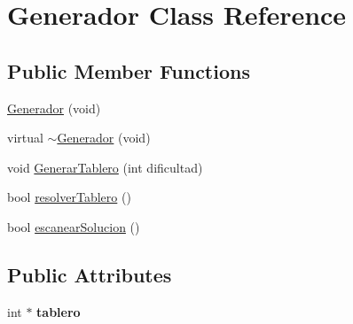 \hypertarget{class_generador}{\section{Generador Class Reference}
\label{class_generador}
}
\subsection*{Public Member Functions}
\begin{DoxyCompactItemize}
\item 
\hyperlink{class_generador_a6b8606d04a21242daa5b7b0313ae8029}{Generador} (void)
\item 
virtual \hyperlink{class_generador_a088aa3e97fb0a1e13b168c362485e7c8}{$\sim$\-Generador} (void)
\item 
void \hyperlink{class_generador_ab67862d2f13c1e9b18b29b385bf5a20e}{Generar\-Tablero} (int dificultad)
\item 
bool \hyperlink{class_generador_a430dccdbfe57088212912c30259f8757}{resolver\-Tablero} ()
\item 
bool \hyperlink{class_generador_a0e8bb058054de56ece51fc880a23fd07}{escanear\-Solucion} ()
\end{DoxyCompactItemize}
\subsection*{Public Attributes}
\begin{DoxyCompactItemize}
\item 
\hypertarget{class_generador_ab990ce2cbce0dcf52b0ed827545e0b16}{int $\ast$ {\bfseries tablero}}\label{class_generador_ab990ce2cbce0dcf52b0ed827545e0b16}

\end{DoxyCompactItemize}



